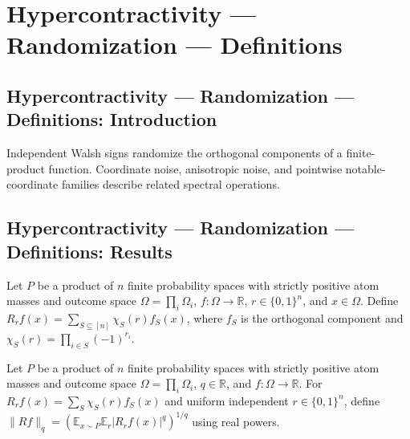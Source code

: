 \section{Hypercontractivity --- Randomization --- Definitions}
\subsection*{Hypercontractivity --- Randomization --- Definitions: Introduction}
Independent Walsh signs randomize the orthogonal components of a finite-product function. Coordinate noise, anisotropic noise, and pointwise notable-coordinate families describe related spectral operations.

\subsection*{Hypercontractivity --- Randomization --- Definitions: Results}

\begin{definition}
\leanok
{}
Let $P$ be a product of $n$ finite probability spaces with strictly positive atom masses and outcome space $\Omega=\prod_i\Omega_i$, $f:\Omega\to\mathbb R$, $r\in\{0,1\}^n$, and $x\in\Omega$. Define $R_rf(x)=\sum_{S\subseteq[n]}\chi_S(r)f_S(x)$, where $f_S$ is the orthogonal component and $\chi_S(r)=\prod_{i\in S}(-1)^{r_i}$.
\end{definition}

\begin{definition}
\leanok
{}
Let $P$ be a product of $n$ finite probability spaces with strictly positive atom masses and outcome space $\Omega=\prod_i\Omega_i$, $q\in\mathbb R$, and $f:\Omega\to\mathbb R$. For $R_rf(x)=\sum_S\chi_S(r)f_S(x)$ and uniform independent $r\in\{0,1\}^n$, define $\|Rf\|_q=(\mathbb E_{x\sim P}\mathbb E_r|R_rf(x)|^q)^{1/q}$ using real powers.
\end{definition}

